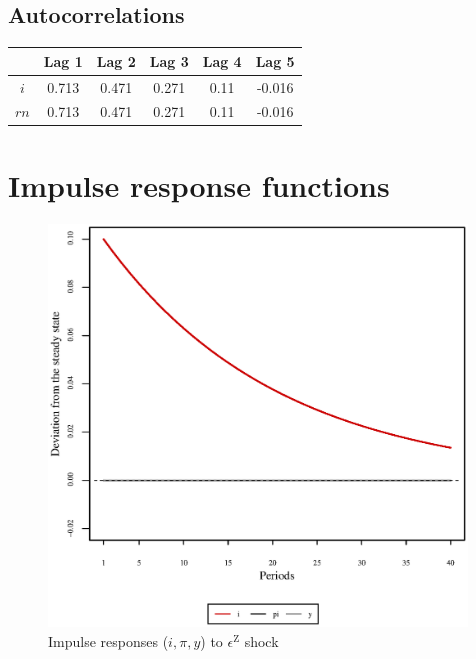 \subsection{Autocorrelations}

\begin{tabular}{c|ccccc|}
  & Lag 1 & Lag 2 & Lag 3 & Lag 4 & Lag 5\\
\hline
$i$ & 0.713 & 0.471 & 0.271 & 0.11 & -0.016 \\
${r\!n}$ & 0.713 & 0.471 & 0.271 & 0.11 & -0.016 \\
\hline
\end{tabular}



\pagebreak

\section{Impulse response functions}

\begin{figure}[h]
\centering
\begin{minipage}{0.5\textwidth}
\vspace*{-3em}
\centering
\includegraphics[width=0.99\textwidth, scale=0.55]{plots/plot_11.eps}
\caption{Impulse responses ($i, \pi, y$) to $\epsilon^{\mathrm{Z}}$ shock}
\end{minipage}
\end{figure}

